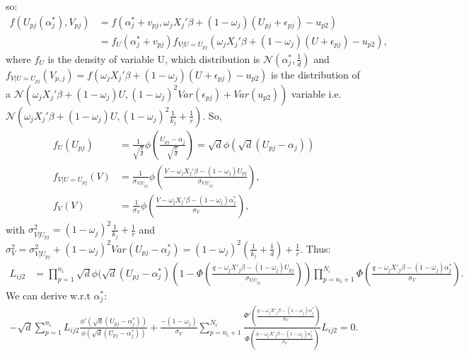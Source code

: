 	so:
	\begin{align*}
		f(U_{p j}(\alpha_{j}^{*}), V_{p j})
		&=f(\alpha_{j}^{*}+v_{p j}, \omega_{j} X_{j}'\beta+(1-\omega_{j})(U_{p j}+\epsilon_{p j})-u_{p 2})\\
		&=f_{U}(\alpha_{j}^{*}+v_{p j})f_{V|U=U_{p j}}(\omega_{j} X_{j}'\beta+(1-\omega_{j})(U+\epsilon_{p j})-u_{p 2}),	
	\end{align*}
	where $f_{U}$ is the density of variable U, which distribution is $\mathcal{N}(\alpha_{j}^{*}, \frac{1}{d})$ and $f_{V|U=U_{p j}}(V_{p, j})=f(\omega_{j} X_{j}'\beta+(1-\omega_{j})(U+\epsilon_{p j})-u_{p 2})$ is the distribution of a $\mathcal{N}(\omega_{j} X_{j}'\beta+(1-\omega_{j})U, (1-\omega_{j})^{2}Var(\epsilon_{p j})+Var(u_{p 2}))$ variable i.e. $\mathcal{N}(\omega_{j} X_{j}'\beta+(1-\omega_{j})U, (1-\omega_{j})^{2}\frac{1}{k_{j}}+\frac{1}{r})$. So,
	\begin{align*}
		f_{U}(U_{p j})&=\frac{1}{\sqrt{\frac{1}{d}}}\phi\left(\frac{U_{p j}-\alpha_{j}}{\sqrt{\frac{1}{d}}}\right)=\sqrt{d}\phi(\sqrt{d}(U_{p j}-\alpha_{j}))\\
		f_{V|U=U_{p j}}(V)&=\frac{1}{\sigma_{V|U_{p j}}}\phi\left(\frac{V-\omega_{j} X_{j}'\beta-(1-\omega_{j})U_{p j}}{\sigma_{V|U_{p j}}}\right),\\
		f_{V}(V)&=\frac{1}{\sigma_{V}}\phi\left(\frac{V-\omega_{j} X_{j}'\beta-(1-\omega_{j})\alpha_{j}^{*}}{\sigma_{V}}\right),
	\end{align*}
		with $\sigma_{V|U_{p j}}^{2}=(1-\omega_{j})^{2}\frac{1}{k_{j}}+\frac{1}{r}$ and $\sigma_{V}^{2}=\sigma_{V|U_{p j}}^{2}+(1-\omega_{j})^{2}Var(U_{p j}-\alpha_{j}^{*})=(1-\omega_{j})^{2}(\frac{1}{k_{j}}+\frac{1}{d})+\frac{1}{r}$.
	Thus:
	\begin{align*}
		L_{i j 2}&=\prod_{p=1}^{n_{i}}\sqrt{d}\phi(\sqrt{d}(U_{p j}-\alpha_{j}^{*})\left(1-\Phi\left(\frac{q-\omega_{j}X'_{j}\beta-(1-\omega_{j})U_{p j}}{\sigma_{V|U_{p j}}}\right)\right)
		\prod_{p=n_{i}+1}^{N_{i}}\Phi\left(\frac{q-\omega_{j}X'_{j}\beta-(1-\omega_{j})\alpha_{j}^{*}}{\sigma_{V}}\right).
	\end{align*}
	We can derive w.r.t $\alpha_{j}^{*}$:
	\begin{align*}
		-\sqrt{d}\sum_{p=1}^{n_{i}}L_{i j 2}\frac{\phi'(\sqrt{d}(U_{p j}-\alpha_{j}^{*}))}{\phi(\sqrt{d}(U_{p j}-\alpha_{j}^{*}))}
		+\frac{-(1-\omega_{j})}{\sigma_{V}}\sum_{p=n_{i}+1}^{N_{i}}\frac{\Phi'\left(\frac{q-\omega_{j}X'_{j}\beta-(1-\omega_{j})\alpha_{j}^{*}}{\sigma_{V}}\right)}{\Phi\left(\frac{q-\omega_{j}X'_{j}\beta-(1-\omega_{j})\alpha_{j}^{*}}{\sigma_{V}}\right)}L_{i j 2}=0.\\
	\end{align*}
